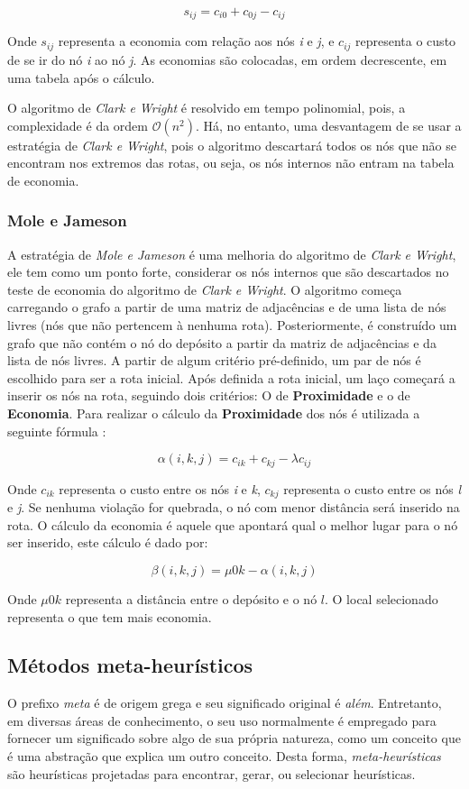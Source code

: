 \[ s_{ij} = c_{i0} + c_{0j} - c_{ij} \]

Onde $s_{ij}$ representa a economia com relação aos nós \emph{i} e \emph{j}, e $c_{ij}$ representa o custo de se ir do nó \emph{i} ao nó \emph{j}. As economias são colocadas, em ordem decrescente, em uma tabela após o cálculo. 

O algoritmo de \emph{Clark e Wright} é resolvido em tempo polinomial, pois, a complexidade é da ordem $\mathcal{O}(n^2)$. Há, no entanto, uma desvantagem de se usar a estratégia de \emph{Clark e Wright}, pois o algoritmo descartará todos os nós que não se encontram nos extremos das rotas, ou seja, os nós internos não entram na tabela de economia.

\subsubsection{Mole e Jameson}

A estratégia de \emph{Mole e Jameson} é uma melhoria do algoritmo de \emph{Clark e Wright}, ele tem como um ponto forte, considerar os nós internos que são descartados no teste de economia do algoritmo de \emph{Clark e Wright}. O algoritmo começa carregando o grafo a partir de uma matriz de adjacências e de uma lista de nós livres (nós que não pertencem à nenhuma rota). Posteriormente, é construído um grafo que não contém o nó do depósito a partir da matriz de adjacências e da lista de nós livres. A partir de algum critério pré-definido, um par de nós é escolhido para ser a rota inicial. Após definida a rota inicial, um laço começará a inserir os nós na rota, seguindo dois critérios: O de \textbf{Proximidade} e o de \textbf{Economia}.
Para realizar o cálculo da \textbf{Proximidade} dos nós é utilizada a seguinte fórmula \cite[p. 33]{maxwell}:

\[\alpha(i, k, j) = c_{ik} + c_{kj} - \lambda c_{ij} \]

Onde $c_{ik}$ representa o custo entre os nós \emph{i} e \emph{k}, $c_{kj}$  representa o custo entre os nós \emph{l} e \emph{j}. Se nenhuma violação for quebrada, o nó com menor distância será inserido na rota. O cálculo da economia é aquele que apontará qual o melhor lugar para o nó ser inserido, este cálculo é dado por:

\[\beta(i, k, j) = \mu 0k - \alpha(i, k, j) \]


Onde \(\mu 0k\) representa a distância entre o depósito e o nó $l$. O local selecionado representa o que tem mais economia.

\subsection{Métodos meta-heurísticos}\label{metaheuristica}
O prefixo \emph{meta} é de origem grega e seu significado original é \emph{além}. Entretanto, em diversas áreas de conhecimento, o seu uso normalmente é empregado para fornecer um significado sobre algo de sua própria natureza, como um conceito que é uma abstração que explica um outro conceito. Desta forma, \emph{meta-heurísticas} são heurísticas projetadas para encontrar, gerar, ou selecionar heurísticas.

